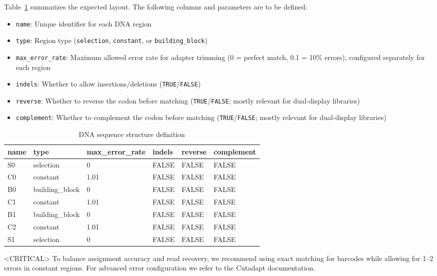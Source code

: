 \documentclass[pdflatex,sn-nature]{sn-jnl}
\begin{document}
Table~\ref{tab:table5} summarizes the expected layout. The following columns and parameters are to be defined: 

\begin{itemize}
  \item \texttt{name}: Unique identifier for each DNA region
  \item \texttt{type}: Region type (\texttt{selection}, \texttt{constant}, or \texttt{building\_block})
  \item \texttt{max\_error\_rate}: Maximum allowed error rate for adapter trimming (0 = perfect match, 0.1 = 10\% errors), configured separately for each region
  \item \texttt{indels}: Whether to allow insertions/deletions (\texttt{TRUE}/\texttt{FALSE})
  \item \texttt{reverse}: Whether to reverse the codon before matching (\texttt{TRUE}/\texttt{FALSE}; mostly relevant for dual-display libraries)
  \item \texttt{complement}: Whether to complement the codon before matching (\texttt{TRUE}/\texttt{FALSE}; mostly relevant for dual-display libraries)
\end{itemize}

\begin{table}[htbp]
\centering
\caption{DNA sequence structure definition}
\label{tab:table5}
\begin{tabular}{llllll}
\toprule
name & type & max\_error\_rate & indels & reverse & complement \\
\midrule
S0 & selection & 0 & FALSE & FALSE & FALSE \\
C0 & constant & 1.01 & FALSE & FALSE & FALSE \\
B0 & building\_block & 0 & FALSE & FALSE & FALSE \\
C1 & constant & 1.01 & FALSE & FALSE & FALSE \\
B1 & building\_block & 0 & FALSE & FALSE & FALSE \\
C2 & constant & 1.01 & FALSE & FALSE & FALSE \\
S1 & selection & 0 & FALSE & FALSE & FALSE \\
\bottomrule
\end{tabular}
\end{table}

<CRITICAL> To balance assignment accuracy and read recovery, we recommend using exact matching for barcodes while allowing for 1--2 errors in constant regions. For advanced error configuration we refer to the Cutadapt \cite{martin_cutadaptremovesadapter_2011} documentation.
\end{document}
